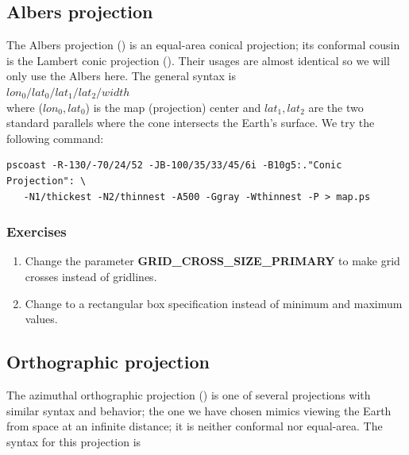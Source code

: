 \documentclass{report}
\begin{document}
\subsection{Albers projection}

The Albers projection () is an equal-area conical projection;
its conformal cousin is the Lambert conic projection ().
Their usages are almost identical so we will only use the Albers here.
The general syntax is \\

$lon_0/lat_0/lat_1/lat_2/width$ \\

\noindent
where ($lon_0, lat_0$) is the map (projection) center and $lat_1, lat_2$
are the two standard parallels where the cone intersects the Earth's surface.
We try the following command:

{\small\begin{verbatim}
pscoast -R-130/-70/24/52 -JB-100/35/33/45/6i -B10g5:."Conic Projection": \
   -N1/thickest -N2/thinnest -A500 -Ggray -Wthinnest -P > map.ps
\end{verbatim}
}

\subsubsection{Exercises}

\begin{enumerate}

\item Change the parameter {\bf GRID\_CROSS\_SIZE\_PRIMARY} to make grid crosses instead of gridlines.

\item Change  to a rectangular box specification instead of
minimum and maximum values.

\end{enumerate}

\subsection{Orthographic projection}

The azimuthal orthographic projection () is one of several
projections with similar syntax and behavior; the one we have
chosen mimics viewing the Earth from space at an infinite distance;
it is neither conformal nor equal-area.
The syntax for this projection is \\
\end{document}
